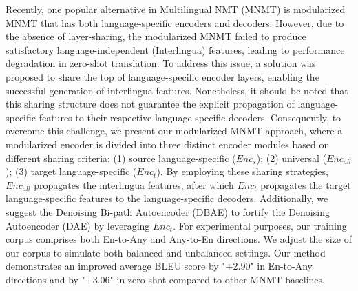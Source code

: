 Recently, one popular alternative in Multilingual NMT (MNMT) is modularized MNMT that has both language-specific encoders and decoders. However, due to the absence of layer-sharing, the modularized MNMT failed to produce satisfactory language-independent (Interlingua) features, leading to performance degradation in zero-shot translation. To address this issue, a solution was proposed to share the top of language-specific encoder layers, enabling the successful generation of interlingua features.  Nonetheless, it should be noted that this sharing structure does not guarantee the explicit propagation of language-specific features to their respective language-specific decoders.  Consequently, to overcome this challenge, we present our modularized MNMT approach, where a modularized encoder is divided into three distinct encoder modules based on different sharing criteria: (1) source language-specific ($Enc_{s}$); (2) universal ($Enc_{all}$); (3) target language-specific ($Enc_{t}$). By employing these sharing strategies, $Enc_{all}$ propagates the interlingua features, after which $Enc_{t}$ propagates the target language-specific features to the language-specific decoders. Additionally, we suggest the Denoising Bi-path Autoencoder (DBAE) to fortify the Denoising Autoencoder (DAE) by leveraging $Enc_{t}$. For experimental purposes, our training corpus comprises both En-to-Any and Any-to-En directions. We adjust the size of our corpus to simulate both balanced and unbalanced settings. Our method demonstrates an improved average BLEU score by "+2.90" in En-to-Any directions and by "+3.06" in zero-shot compared to other MNMT baselines.